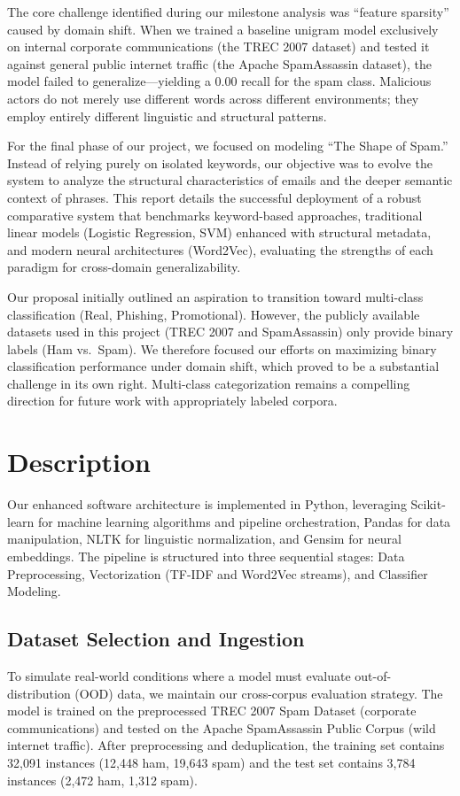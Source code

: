 \documentclass[sigconf]{acmart}
\begin{document}
The core challenge identified during our milestone analysis was ``feature sparsity'' caused by domain shift. When we trained a baseline unigram model exclusively on internal corporate communications (the TREC 2007 dataset) and tested it against general public internet traffic (the Apache SpamAssassin dataset), the model failed to generalize---yielding a 0.00 recall for the spam class. Malicious actors do not merely use different words across different environments; they employ entirely different linguistic and structural patterns.

For the final phase of our project, we focused on modeling ``The Shape of Spam.'' Instead of relying purely on isolated keywords, our objective was to evolve the system to analyze the structural characteristics of emails and the deeper semantic context of phrases. This report details the successful deployment of a robust comparative system that benchmarks keyword-based approaches, traditional linear models (Logistic Regression, SVM) enhanced with structural metadata, and modern neural architectures (Word2Vec), evaluating the strengths of each paradigm for cross-domain generalizability.

Our proposal initially outlined an aspiration to transition toward multi-class classification (Real, Phishing, Promotional). However, the publicly available datasets used in this project (TREC 2007 and SpamAssassin) only provide binary labels (Ham vs.\ Spam). We therefore focused our efforts on maximizing binary classification performance under domain shift, which proved to be a substantial challenge in its own right. Multi-class categorization remains a compelling direction for future work with appropriately labeled corpora.

\section{Description}
Our enhanced software architecture is implemented in Python, leveraging Scikit-learn for machine learning algorithms and pipeline orchestration, Pandas for data manipulation, NLTK for linguistic normalization, and Gensim for neural embeddings. The pipeline is structured into three sequential stages: Data Preprocessing, Vectorization (TF-IDF and Word2Vec streams), and Classifier Modeling.

\subsection{Dataset Selection and Ingestion}
To simulate real-world conditions where a model must evaluate out-of-distribution (OOD) data, we maintain our cross-corpus evaluation strategy. The model is trained on the preprocessed TREC 2007 Spam Dataset (corporate communications) and tested on the Apache SpamAssassin Public Corpus (wild internet traffic). After preprocessing and deduplication, the training set contains 32,091 instances (12,448 ham, 19,643 spam) and the test set contains 3,784 instances (2,472 ham, 1,312 spam).
\end{document}
